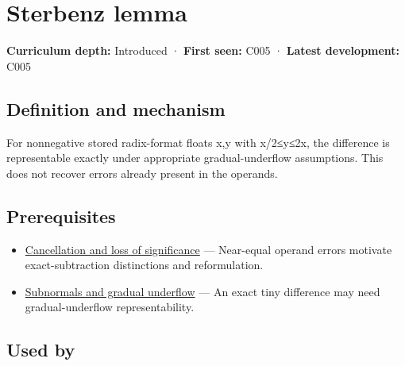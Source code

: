 \hypertarget{appendix-399b7ad53f39}{}\label{referencestart:appendix-399b7ad53f39}
\section{Sterbenz lemma}\label{appendix-399b7ad53f39-sterbenz-lemma}

\hypertarget{appendix-399b7ad53f39-sterbenz-lemma}{}

\textbf{Curriculum depth:} Introduced · \textbf{First seen:} C005 · \textbf{Latest development:} C005

\begin{allmightroledefinition}

\subsection{Definition and mechanism}\label{appendix-399b7ad53f39-definition-and-mechanism}

\hypertarget{appendix-399b7ad53f39-definition-and-mechanism}{}

For nonnegative stored radix-format floats x,y with x/2≤y≤2x, the difference is representable exactly under appropriate gradual-underflow assumptions. This does not recover errors already present in the operands.

\end{allmightroledefinition}

\subsection{Prerequisites}\label{appendix-399b7ad53f39-prerequisites}

\hypertarget{appendix-399b7ad53f39-prerequisites}{}

\begin{itemize}
\tightlist
\item
  \hyperref[appendix-a2773a6a2f9d]{Cancellation and loss of significance} --- Near-equal operand errors motivate exact-subtraction distinctions and reformulation.
\item
  \hyperref[appendix-00a6e044c437]{Subnormals and gradual underflow} --- An exact tiny difference may need gradual-underflow representability.
\end{itemize}

\subsection{Used by}\label{appendix-399b7ad53f39-used-by}

